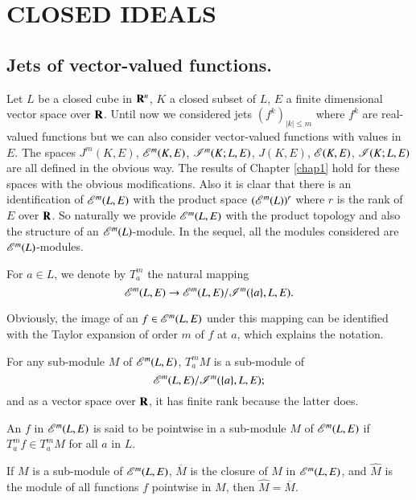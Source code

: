 \chapter{CLOSED IDEALS}\label{chap2}
\pageoriginale

\section[Jets of vector-valued functions]{Jets of vector-valued functions.}\label{chap2-sec1}

Let $L$ be a closed cube in $\mathbf{R}^{n}$, $K$ a closed subset of $L$, $E$ a finite dimensional vector space over $\mathbf{R}$. Until now we considered jets $(f^{k})_{|k|\leq m}$ where $f^{k}$ are real-valued functions but we can also consider vector-valued functions with values in $E$. The spaces $J^{m}(K,E)$, $\mathscr{E}^{m}(K,E)$, $\mathscr{I}^{m}(K;L,E)$, $J(K,E)$, $\mathscr{E}(K,E)$, $\mathscr{I}(K;L,E)$ are all defined in the obvious way. The results of Chapter \ref{chap1} hold for these spaces with the obvious modifications. Also it is claar that there is an identification of $\mathscr{E}^{m}(L,E)$ with the product space $(\mathscr{E}^{m}(L))^{r}$ where $r$ is the rank of $E$ over $\mathbf{R}$. So naturally we provide $\mathscr{E}^{m}(L,E)$ with the product topology and also the structure of an $\mathscr{E}^{m}(L)$-module. In the sequel, all the modules considered are $\mathscr{E}^{m}(L)$-modules.

\begin{definition}\label{chap2-defi1.1}
For $a\in L$, we denote by $T^{m}_{a}$ the natural mapping
$$
\mathscr{E}^{m}(L,E)\to \mathscr{E}^{m}(L,E)/\mathscr{I}^{m}(\{a\},L,E).
$$

Obviously, the image of an $f\in \mathscr{E}^{m}(L,E)$ under this mapping can be identified with the Taylor expansion of order $m$ of $f$ at $a$, which explains the notation.

For any sub-module $M$ of $\mathscr{E}^{m}(L,E)$, $T^{m}_{a}M$ is a sub-module of 
$$
\mathscr{E}^{m}(L,E)/\mathscr{I}^{m}(\{a\},L,E);
$$ 
and as a vector space over $\mathbf{R}$, it has finite rank because the latter does.
\end{definition}

\begin{definition}\label{chap2-defi1.2}
An $f$ in $\mathscr{E}^{m}(L,E)$ is said to be pointwise in a sub-module $M$ of $\mathscr{E}^{m}(L,E)$ if $T^{m}_{a}f\in T^{m}_{a}M$ for all $a$ in $L$.
\end{definition}

\begin{theorem}\label{chap2-thm1.3}
If $M$ is a sub-module of $\mathscr{E}^{m}(L,E)$, $\overline{M}$ is the closure of $M$ in $\mathscr{E}^{m}(L,E)$, and $\widehat{M}$ is the module of all functions $f$ pointwise in $M$, then $\widehat{M}=\overline{M}$.
\end{theorem}

